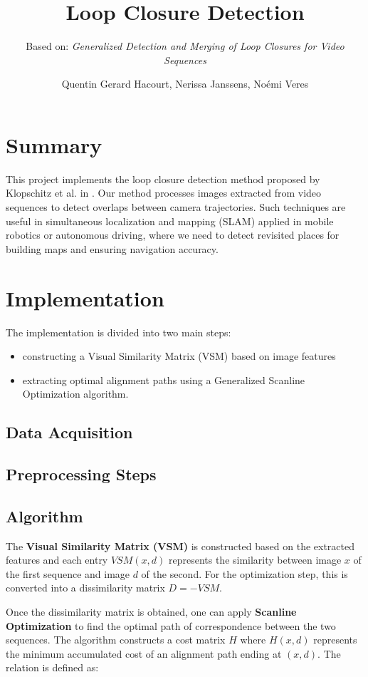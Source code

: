\documentclass[a4paper]{article}
\title{Loop Closure Detection}
\subtitle{Based on: \textit{Generalized Detection and Merging of Loop Closures for Video Sequences}}
\author{Quentin Gerard Hacourt, Nerissa Janssens, Noémi Veres}
\begin{document}
\maketitle


\tableofcontents
\thispagestyle{empty}
\newpage

\setcounter{page}{1}


\section{Summary}
This project implements the loop closure detection method proposed by Klopschitz et al. in \cite{Klop}. Our method processes images extracted from video sequences to detect overlaps between camera trajectories. Such techniques are useful in simultaneous localization and mapping (SLAM) applied in mobile robotics or autonomous driving, where we need to detect revisited places for building maps and ensuring navigation accuracy.


\section{Implementation}
The implementation is divided into two main steps:
\begin{itemize}
    \item constructing a Visual Similarity Matrix (VSM) based on image features
    \item extracting optimal alignment paths using a Generalized Scanline Optimization algorithm.
\end{itemize}

\subsection{Data Acquisition}
\subsection{Preprocessing Steps}
\subsection{Algorithm}
The \textbf{Visual Similarity Matrix (VSM)} is constructed based on the extracted features and each entry $VSM(x,d)$ represents the similarity between image $x$ of the first sequence and image $d$ of the second. For the optimization step, this is converted into a dissimilarity matrix $D = -VSM$.

Once the dissimilarity matrix is obtained, one can apply \textbf{Scanline Optimization} to find the optimal path of correspondence between the two sequences. The algorithm constructs a cost matrix $H$ where $H(x,d)$ represents the minimum accumulated cost of an alignment path ending at $(x,d)$. The relation is defined as:
\end{document}
